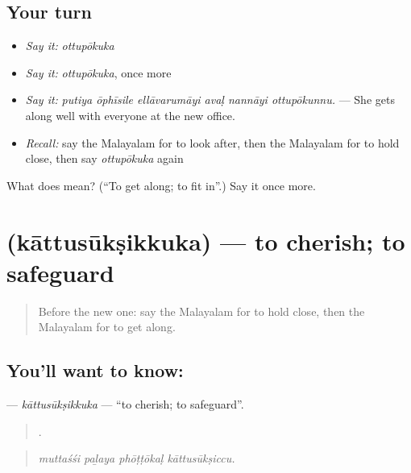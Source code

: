 \subsection*{Your turn}
\begin{itemize}
\raggedright
  \item \emph{Say it:} \emph{ottupōkuka}
  \item \emph{Say it:} \emph{ottupōkuka}, once more
  \item \emph{Say it:} \emph{putiya ōphīsile ellāvarumāyi avaḷ nannāyi ottupōkunnu.} — She gets along well with everyone at the new office.
  \item \emph{Recall:} say the Malayalam for to look after, then the Malayalam for to hold close, then say \emph{ottupōkuka} again
\end{itemize}

\begin{tcolorbox}[breakable,colback=teal!4,colframe=teal!35!black,title={Before you move on}]
What does  mean? (\textquotedblleft{}To get along; to fit in\textquotedblright{}.) Say it once more.
\end{tcolorbox}
\section[\texorpdfstring{\ml{കാത്തുസൂക്ഷിക്കുക} (kāttusūkṣikkuka)}{കാത്തുസൂക്ഷിക്കുക (kāttusūkṣikkuka)}]{ (kāttusūkṣikkuka) — to cherish; to safeguard}

\label{lesson:ML-C559-kattusuksikkuka}



\begin{quote}
Before the new one: say the Malayalam for to hold close, then the Malayalam for to get along.
\end{quote}

\subsection*{You'll want to know: }
\textbf{} — \emph{kāttusūkṣikkuka} — \textquotedblleft{}to cherish; to safeguard\textquotedblright{}.

\begin{quote}
   .
\end{quote}

\begin{quote}
\emph{muttaśśi paḻaya phōṭṭōkaḷ kāttusūkṣiccu.}
\end{quote}

